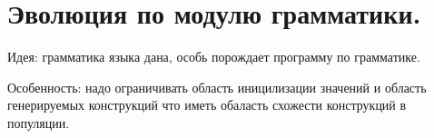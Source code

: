 \section{Эволюция по модулю грамматики.}
Идея: грамматика языка дана, особь порождает программу по грамматике.

Особенность: надо ограничивать область иницилизации значений и область генерируемых конструкций что иметь обаласть схожести конструкций в популяции. 
